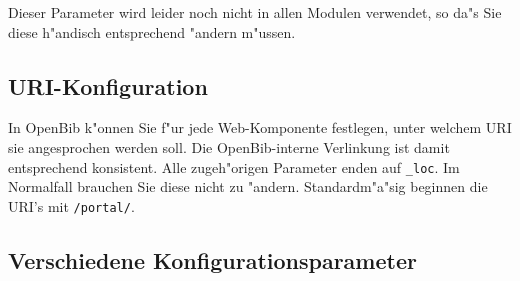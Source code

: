 \documentclass[11pt, twoside, a4paper, BCOR8mm, DIV12, bibtotoc,idxtotoc]{scrbook}
\begin{document}
Dieser Parameter wird leider noch nicht in allen Modulen verwendet, so
da"s Sie diese h"andisch entsprechend "andern m"ussen.
 
\subsection{URI-Konfiguration}

In OpenBib k"onnen Sie f"ur jede Web-Komponente festlegen, unter
welchem URI sie angesprochen werden soll. Die OpenBib-interne
Verlinkung ist damit entsprechend konsistent. Alle zugeh"origen
Parameter enden auf \texttt{\_loc}. Im Normalfall brauchen Sie diese
nicht zu "andern. Standardm"a"sig beginnen die URI's mit \texttt{/portal/}.



\subsection{Verschiedene Konfigurationsparameter}
\end{document}
